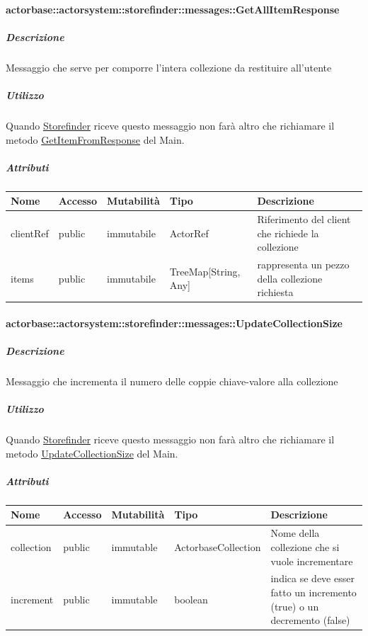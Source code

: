 \documentclass{scalatekids-article}
\begin{document}
\paragraph{actorbase::actorsystem::storefinder::messages::GetAllItemResponse}
\label{sec:actorbase::actorsystem::storefinder::messages::GetAllItemResponse}

\subparagraph{Descrizione}

Messaggio che serve per comporre l'intera collezione da restituire all'utente

\subparagraph{Utilizzo}

Quando \hyperref[sec:actorbase::actorsystem::storefinder::Storefinder]{Storefinder}
riceve questo messaggio non farà altro che richiamare il metodo
\hyperref[sec:actorbase::actorsystem::main::messages::GetItemFromResponse]{GetItemFromResponse} del Main.

\subparagraph{Attributi}
\begin{tabular}{| p{3cm} | p{1.5cm} | p{2cm} | p{2cm} | p{8.5cm} |}
  \hline
  Nome & Accesso & Mutabilità & Tipo & Descrizione\\
  \hline
  clientRef & public & immutabile & ActorRef & Riferimento del client che richiede la collezione\\
  \hline
  items & public & immutabile & TreeMap[String, Any] & rappresenta un pezzo della collezione richiesta\\
  \hline
\end{tabular}

\paragraph{actorbase::actorsystem::storefinder::messages::UpdateCollectionSize}
\label{sec:actorbase::actorsystem::storefinder::messages::UpdateCollectionSize}

\subparagraph{Descrizione}

Messaggio che incrementa il numero delle coppie chiave-valore alla collezione

\subparagraph{Utilizzo}

Quando \hyperref[sec:actorbase::actorsystem::storefinder::Storefinder]{Storefinder}
riceve questo messaggio non farà altro che richiamare il metodo
\hyperref[sec:actorbase::actorsystem::main::messages::UpdateCollectionSize]{UpdateCollectionSize} del Main.

\subparagraph{Attributi}
\begin{tabular}{| p{3cm} | p{1.5cm} | p{2cm} | p{2cm} | p{8.5cm} |}
  \hline
  Nome & Accesso & Mutabilità & Tipo & Descrizione\\
  \hline
  collection & public & immutable & ActorbaseCollection & Nome della collezione che si vuole incrementare\\
  \hline
  increment & public & immutable & boolean & indica se deve esser fatto un incremento (true) o un decremento (false)\\
  \hline
\end{tabular}
\end{document}
